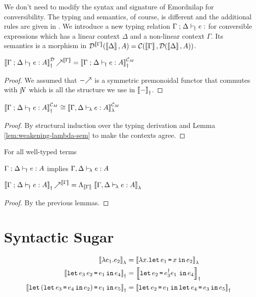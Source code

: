\documentclass[runningheads,envcountsame]{llncs}
\newcommand{\monad}{M}
\begin{document}
We don't need to modify the syntax and signature of Emordnilap for conversibility. The typing and semantics, of course, is different and the additional rules are given in . We introduce a new typing relation $\typeruled{\Gamma}{\Delta}{e}{A}$ for conversible expressions which has a linear context $\Delta$ and a non-linear context $\Gamma$. Its semantics is a morphism in $\D^{\sem{\Gamma}}(\sem{\Delta}, A) = \C(\sem{\Gamma}, \homD{\sem{\Delta}}{A})$.    

\begin{lemma}
    $\f{\semD{\typeruled{\Gamma}{\Delta}{e}{\D}{A}}^\D}^{\sem{\Gamma}} = \semD{\typeruled{\Gamma}{\Delta}{e}{\C_\monad}{A}}^{\C_\monad}$
\end{lemma}
\begin{proof}
    We assumed that $\f{-}$ is a symmetric premonoidal functor that commutes with $\juncurry$ which is all the structure we use in $\semD{-}$. 
\end{proof}
\begin{lemma}
    $\semD{\typeruled{\Gamma}{\Delta}{e}{\C_\monad}{A}}^{\C_\monad} \cong \semL{\typerulel{\Gamma, \Delta}{e}{A}}^{\C_\monad}$
\end{lemma}
\begin{proof}
    By structural induction over the typing derivation and Lemma \ref{lem:weakening-lambda-sem} to make the contexts agree.
\end{proof}

\begin{theorem} For all well-typed terms
    \begin{lemmalist}
    \item $\typeruled{\Gamma}{\Delta}{e}{j}{A}$ implies $\typerulel{\Gamma, \Delta}{e}{A}$
    \item $\f{\semD{\typeruled{\Gamma}{\Delta}{e}{\D}{A}}}^{\sem{\Gamma}} = \curry_{\sem{\Gamma}}\,\semL{\typerulel{\Gamma, \Delta}{e}{A}}$
    \end{lemmalist}
\end{theorem}
\begin{proof}
    By the previous lemmas.
\end{proof}

 
\section{Syntactic Sugar}

\begin{align}
    \semL{\elam{e_1}{e_2}} &= \semL{\elam{x}{\elet{e_1}{x}{e_2}}} \\
    \semD{\elet{\eapp{e_3}{e_2}}{e_1}{e_4}} &= \semD{\elet{e_2}{\eapp{\rev{e_3}{e_1}}}{e_4}} \\
    \semD{\elet{(\elet{e_3}{e_4}{e_2})}{e_1}{e_5}} &= \semD{\elet{e_2}{e_1}{\elet{e_4}{e_3}{e_5}}}
\end{align}
\end{document}
